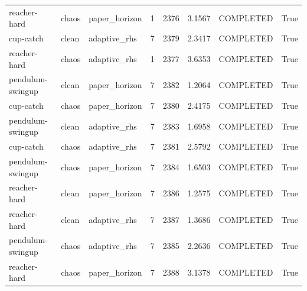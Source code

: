 \begin{tabular}{llllllll}
reacher-hard & chaos & paper\_horizon & 1 & 2376 & 3.1567 & COMPLETED & True \\
cup-catch & clean & adaptive\_rhs & 7 & 2379 & 2.3417 & COMPLETED & True \\
reacher-hard & chaos & adaptive\_rhs & 1 & 2377 & 3.6353 & COMPLETED & True \\
pendulum-swingup & clean & paper\_horizon & 7 & 2382 & 1.2064 & COMPLETED & True \\
cup-catch & chaos & paper\_horizon & 7 & 2380 & 2.4175 & COMPLETED & True \\
pendulum-swingup & clean & adaptive\_rhs & 7 & 2383 & 1.6958 & COMPLETED & True \\
cup-catch & chaos & adaptive\_rhs & 7 & 2381 & 2.5792 & COMPLETED & True \\
pendulum-swingup & chaos & paper\_horizon & 7 & 2384 & 1.6503 & COMPLETED & True \\
reacher-hard & clean & paper\_horizon & 7 & 2386 & 1.2575 & COMPLETED & True \\
reacher-hard & clean & adaptive\_rhs & 7 & 2387 & 1.3686 & COMPLETED & True \\
pendulum-swingup & chaos & adaptive\_rhs & 7 & 2385 & 2.2636 & COMPLETED & True \\
reacher-hard & chaos & paper\_horizon & 7 & 2388 & 3.1378 & COMPLETED & True \\
\bottomrule
\end{tabular}
